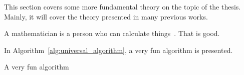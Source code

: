 This section covers some more fundamental theory on the topic of the thesis.
Mainly, it will cover the theory presented in many previous works.

A mathematician is a person who can calculate things~\parencite{wang2019cutting}.
That is good.

In Algorithm~\ref{alg:universal_algorithm}, a very fun algorithm is presented.

\begin{algorithm}
    \caption{A very fun algorithm}
    \label{alg:universal_algorithm}
    
\end{algorithm}

